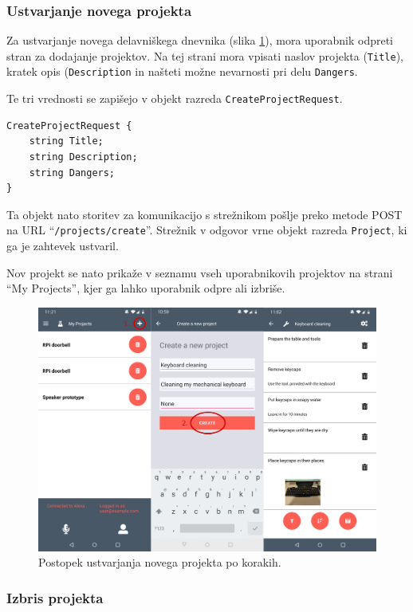 \documentclass[a4paper, 12pt]{book}
\begin{document}
\subsubsection{Ustvarjanje novega projekta}

Za ustvarjanje novega delavniškega dnevnika (slika \ref{app_newproject}), mora uporabnik odpreti stran za dodajanje projektov.
Na tej strani mora vpisati naslov projekta (\texttt{Title}), kratek opis (\texttt{Description} in našteti možne nevarnosti pri delu \texttt{Dangers}.

Te tri vrednosti se zapišejo v objekt razreda \texttt{CreateProjectRequest}.
\begin{Verbatim}[commandchars=+\[\]]
CreateProjectRequest {
    string Title;
    string Description;
    string Dangers;
}
\end{Verbatim}

Ta objekt nato storitev za komunikacijo s strežnikom pošlje preko metode POST na URL \enquote{\texttt{/projects/create}}.
Strežnik v odgovor vrne objekt razreda \texttt{Project}, ki ga je zahtevek ustvaril.

Nov projekt se nato prikaže v seznamu vseh uporabnikovih projektov na strani \enquote{My Projects}, kjer ga lahko uporabnik odpre ali izbriše.

\begin{figure}[H]
\begin{center}
\includegraphics[width=13cm]{app_newproject}
\end{center}
	\caption{Postopek ustvarjanja novega projekta po korakih.}
\label{app_newproject}
\end{figure}

\subsubsection{Izbris projekta}
\end{document}
